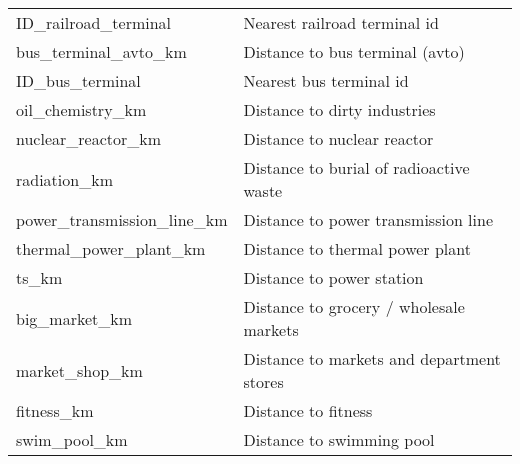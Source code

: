 \begin{longtable}[c]{ll}
    ID\_railroad\_terminal                     & Nearest railroad terminal id                                                                                              \\
    bus\_terminal\_avto\_km                    & Distance to bus terminal (avto)                                                                                           \\
    ID\_bus\_terminal                          & Nearest bus terminal id                                                                                                   \\
    oil\_chemistry\_km                         & Distance to dirty industries                                                                                              \\
    nuclear\_reactor\_km                       & Distance to nuclear reactor                                                                                               \\
    radiation\_km                              & Distance to burial of radioactive waste                                                                                   \\
    power\_transmission\_line\_km              & Distance to power transmission line                                                                                       \\
    thermal\_power\_plant\_km                  & Distance to thermal power plant                                                                                           \\
    ts\_km                                     & Distance to power station                                                                                                 \\
    big\_market\_km                            & Distance to grocery / wholesale markets                                                                                   \\
    market\_shop\_km                           & Distance to markets and department stores                                                                                 \\
    fitness\_km                                & Distance to fitness                                                                                                       \\
    swim\_pool\_km                             & Distance to swimming pool                                                                                                 \\

\end{longtable}
